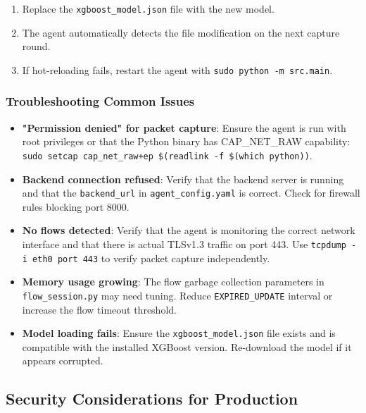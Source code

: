 \documentclass[../Main.tex]{subfiles}
\begin{document}
\begin{enumerate}
    \item Replace the \texttt{xgboost\_model.json} file with the new model.
    \item The agent automatically detects the file modification on the next capture round.
    \item If hot-reloading fails, restart the agent with \texttt{sudo python -m src.main}.
\end{enumerate}

\subsubsection{Troubleshooting Common Issues}

\begin{itemize}
    \item \textbf{"Permission denied" for packet capture}: Ensure the agent is run with root privileges or that the Python binary has CAP\_NET\_RAW capability: \texttt{sudo setcap cap\_net\_raw+ep \$(readlink -f \$(which python))}.
    \item \textbf{Backend connection refused}: Verify that the backend server is running and that the \texttt{backend\_url} in \texttt{agent\_config.yaml} is correct. Check for firewall rules blocking port 8000.
    \item \textbf{No flows detected}: Verify that the agent is monitoring the correct network interface and that there is actual TLSv1.3 traffic on port 443. Use \texttt{tcpdump -i eth0 port 443} to verify packet capture independently.
    \item \textbf{Memory usage growing}: The flow garbage collection parameters in \texttt{flow\_session.py} may need tuning. Reduce \texttt{EXPIRED\_UPDATE} interval or increase the flow timeout threshold.
    \item \textbf{Model loading fails}: Ensure the \texttt{xgboost\_model.json} file exists and is compatible with the installed XGBoost version. Re-download the model if it appears corrupted.
\end{itemize}

\subsection{Security Considerations for Production}
\end{document}
